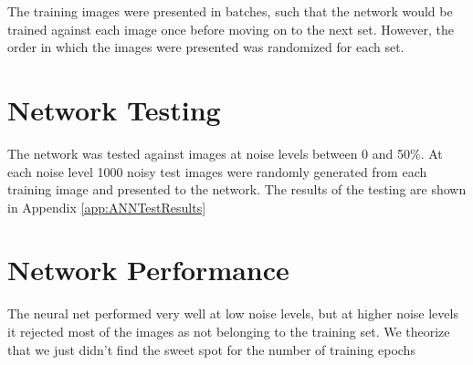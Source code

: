 The training images were presented in batches, such that the network would be trained against each image once before moving on to the next set. However, the order in which the images were presented was randomized for each set.

\section{Network Testing}

The network was tested against images at noise levels between 0 and 50\%. At each noise level 1000 noisy test images were randomly generated from each training image and presented to the network. The results of the testing are shown in Appendix \ref{app:ANNTestResults}

\section{Network Performance}

The neural net performed very well at low noise levels, but at higher noise levels it rejected most of the images as not belonging to the training set. We theorize that we just didn't find the sweet spot for the number of training epochs

